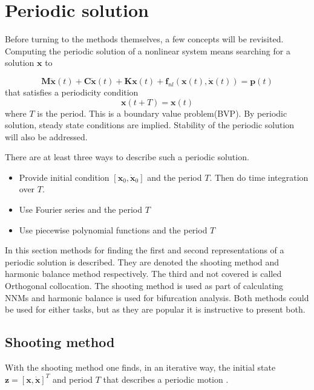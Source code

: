 

\section{Periodic solution}
\label{sec:periodic-solution}

Before turning to the methods themselves, a few concepts will be revisited.
Computing the periodic solution of a nonlinear system means searching for a
solution $\bm x$ to

\begin{equation}
    \label{eq:per_eom}
  \bm M \ddot{\bm x}(t) + \bm C \dot{\bm x}(t) + \bm K \bm x(t) +
  \bm f_{nl} \left( \bm x(t), \dot{ \bm x}(t) \right) = \bm p (t)
\end{equation}
that satisfies a periodicity condition
\begin{equation}
  \label{eq:per_condtion}
  \bm x(t+T) = \bm x(t)
\end{equation}
where $T$ is the period. This is a boundary value problem(BVP). By periodic
solution, steady state conditions are implied. Stability of the periodic
solution will also be addressed.


There are at least three ways to describe such a periodic solution.

\begin{itemize}
\item Provide initial condition $\left[\bm x_0, \dot{\bm x}_0 \right]$ and the
  period $T$. Then do time integration over $T$.
\item Use Fourier series and the period $T$
\item Use piecewise polynomial functions and the period $T$
\end{itemize}

In this section methods for finding the first and second representations of a
periodic solution is described. They are denoted the shooting method and
harmonic balance method respectively. The third and not covered is called
Orthogonal collocation. The shooting method is used as part of calculating NNMs
and harmonic balance is used for bifurcation analysis. Both methods could be
used for either tasks, but as they are popular it is instructive to present
both.

\subsection{Shooting method}
\label{sec:shooting_method}

With the shooting method one finds, in an iterative way, the initial state $\bm
z = [\bm x, \dot{\bm x}]^T$ and period $T$ that describes a periodic
motion \autocite{nayfeh2008applied}.

